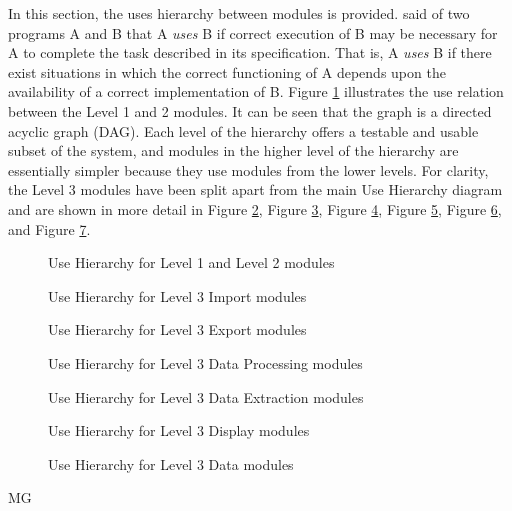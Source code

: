 \documentclass[12pt, titlepage]{article}
\begin{document}
In this section, the uses hierarchy between modules is
provided. \cite{Parnas1978} said of two programs A and B that A {\em uses} B if
correct execution of B may be necessary for A to complete the task described in
its specification. That is, A {\em uses} B if there exist situations in which
the correct functioning of A depends upon the availability of a correct
implementation of B.  Figure \ref{figure:UH} illustrates the use relation
between
the Level 1 and 2 modules. It can be seen that the graph is a directed acyclic
graph
(DAG). Each level of the hierarchy offers a testable and usable subset of the
system, and modules in the higher level of the hierarchy are essentially simpler
because they use modules from the lower levels. For clarity, the Level 3 modules
have been split apart from the main Use Hierarchy diagram and are shown in more
detail in Figure \ref{figure:UHIm}, Figure \ref{figure:UHEx}, Figure
\ref{figure:UHDP}, Figure \ref{figure:UHDE}, Figure \ref{figure:UHDisp}, and
Figure \ref{figure:UHData}.

\begin{figure}[h!]
	\centering
	
	\caption{Use Hierarchy for Level 1 and Level 2 modules}
	\label{figure:UH}
\end{figure}

\begin{figure}[h!]
	\centering
	
	\caption{Use Hierarchy for Level 3 Import modules}
	\label{figure:UHIm}
\end{figure}

\begin{figure}[h!]
	\centering
	
	\caption{Use Hierarchy for Level 3 Export modules}
	\label{figure:UHEx}
\end{figure}

\begin{figure}[h!]
	\centering
	
	\caption{Use Hierarchy for Level 3 Data Processing modules}
	\label{figure:UHDP}
\end{figure}

\begin{figure}[h!]
	\centering
	
	\caption{Use Hierarchy for Level 3 Data Extraction modules}
	\label{figure:UHDE}
\end{figure}

\begin{figure}[h!]
	\centering
	
	\caption{Use Hierarchy for Level 3 Display modules}
	\label{figure:UHDisp}
\end{figure}

\begin{figure}[h!]
	\centering
	
	\caption{Use Hierarchy for Level 3 Data modules}
	\label{figure:UHData}
\end{figure}


\clearpage


 {MG}
\end{document}
